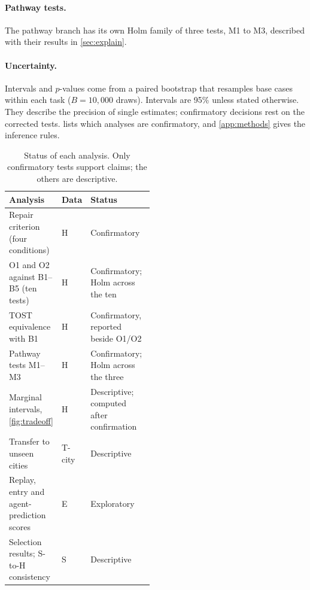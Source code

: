 \paragraph{Pathway tests.}
The pathway branch has its own Holm family of three tests, M1 to M3, described with their results in
\cref{sec:explain}.

\paragraph{Uncertainty.}
Intervals and $p$-values come from a paired bootstrap that resamples base cases within each task
($B = 10{,}000$ draws). Intervals are 95\% unless stated otherwise. They describe the precision of single estimates;
confirmatory decisions rest on the corrected tests.  lists which analyses are confirmatory, and
\cref{app:methods} gives the inference rules.

\begin{table}[t]
\centering\small
\caption{Status of each analysis. Only confirmatory tests support claims; the others are descriptive.}
\label{tab:status}
\begin{tabularx}{\linewidth}{@{}L{0.31\linewidth}L{0.17\linewidth}Y@{}}
\toprule
Analysis & Data & Status \\
\midrule
Repair criterion (four conditions) & H & Confirmatory \\
O1 and O2 against B1--B5 (ten tests) & H & Confirmatory; Holm across the ten \\
TOST equivalence with B1 & H & Confirmatory, reported beside O1/O2 \\
Pathway tests M1--M3 & H & Confirmatory; Holm across the three \\
Marginal intervals, \cref{fig:tradeoff} & H & Descriptive; computed after confirmation \\
Transfer to unseen cities & T-city & Descriptive \\
Replay, entry and agent-prediction scores & E & Exploratory \\
Selection results; S-to-H consistency & S & Descriptive \\
\bottomrule
\end{tabularx}
\end{table}
